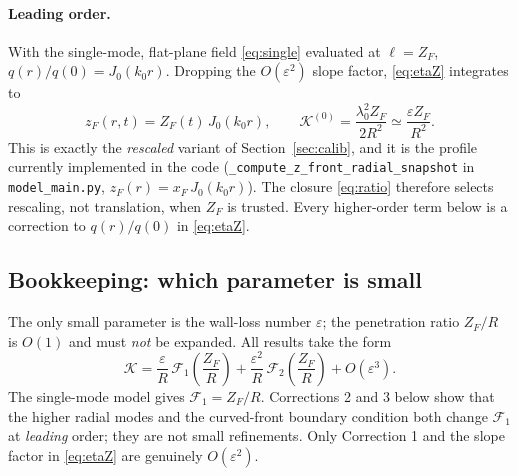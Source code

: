 \documentclass[11pt]{article}
\numberwithin{equation}{section}
\begin{document}
\paragraph{Leading order.} With the single-mode, flat-plane field \eqref{eq:single} evaluated at $\ell=Z_F$, $q(r)/q(0)=J_0(k_0r)$. Dropping the $O(\varepsilon^2)$ slope factor, \eqref{eq:etaZ} integrates to
\begin{equation}z_F(r,t)=Z_F(t)\,J_0(k_0r),\qquad \mathcal K^{(0)}=\frac{\lambda_0^2Z_F}{2R^2}\simeq\frac{\varepsilon Z_F}{R^2}.\label{eq:K0}\end{equation}
This is exactly the \emph{rescaled} variant of Section~\ref{sec:calib}, and it is the profile currently implemented in the code (\texttt{\_compute\_z\_front\_radial\_snapshot} in \texttt{model\_main.py}, $z_F(r)=x_F\,J_0(k_0r)$). The closure \eqref{eq:ratio} therefore selects rescaling, not translation, when $Z_F$ is trusted. Every higher-order term below is a correction to $q(r)/q(0)$ in \eqref{eq:etaZ}.

\subsection{Bookkeeping: which parameter is small}
The only small parameter is the wall-loss number $\varepsilon$; the penetration ratio $Z_F/R$ is $O(1)$ and must \emph{not} be expanded. All results take the form
\begin{equation}\mathcal K=\frac{\varepsilon}{R}\,\mathcal F_1\!\left(\frac{Z_F}{R}\right)+\frac{\varepsilon^2}{R}\,\mathcal F_2\!\left(\frac{Z_F}{R}\right)+O(\varepsilon^3).\end{equation}
The single-mode model gives $\mathcal F_1=Z_F/R$. Corrections 2 and 3 below show that the higher radial modes and the curved-front boundary condition both change $\mathcal F_1$ at \emph{leading} order; they are not small refinements. Only Correction 1 and the slope factor in \eqref{eq:etaZ} are genuinely $O(\varepsilon^2)$.
\end{document}

